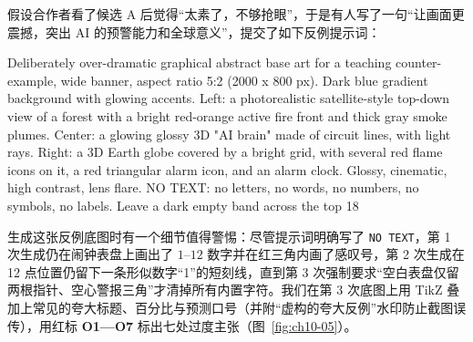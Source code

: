 假设合作者看了候选 A 后觉得“太素了，不够抢眼”，于是有人写了一句“让画面更震撼，突出 AI 的预警能力和全球意义”，提交了如下反例提示词：

\begin{Prompt}
Deliberately over-dramatic graphical abstract base art for a teaching
counter-example, wide banner, aspect ratio 5:2 (2000 x 800 px).
Dark blue gradient background with glowing accents.
Left: a photorealistic satellite-style top-down view of a forest with a bright
red-orange active fire front and thick gray smoke plumes.
Center: a glowing glossy 3D "AI brain" made of circuit lines, with light rays.
Right: a 3D Earth globe covered by a bright grid, with several red flame icons
on it, a red triangular alarm icon, and an alarm clock.
Glossy, cinematic, high contrast, lens flare.
NO TEXT: no letters, no words, no numbers, no symbols, no labels.
Leave a dark empty band across the top 18%
\end{Prompt}

生成这张反例底图时有一个细节值得警惕：尽管提示词明确写了 \texttt{NO TEXT}，第 1 次生成仍在闹钟表盘上画出了 $1\text{--}12$ 数字并在红三角内画了感叹号，第 2 次生成在 12 点位置仍留下一条形似数字“1”的短刻线，直到第 3 次强制要求“空白表盘仅留两根指针、空心警报三角”才清掉所有内置字符。我们在第 3 次底图上用 TikZ 叠加上常见的夸大标题、百分比与预测口号（并附“虚构的夸大反例”水印防止截图误传），用红标 \textbf{O1—O7} 标出七处过度主张（图~\ref{fig:ch10-05}）。

